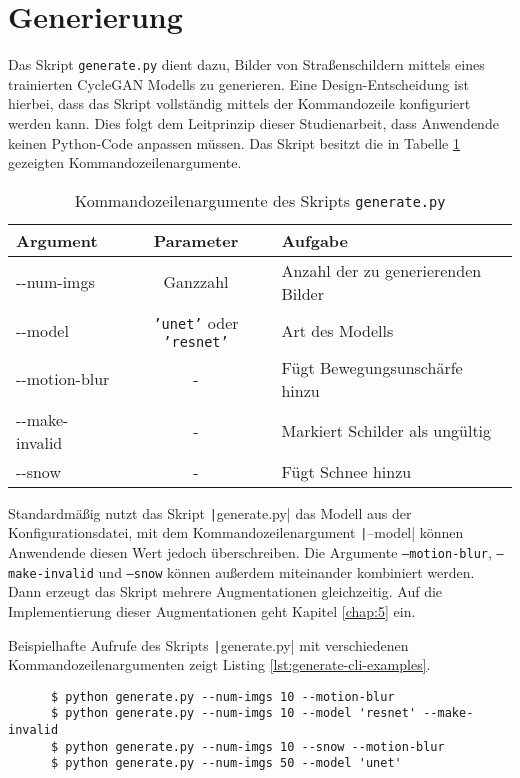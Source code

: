 \section{Generierung}
Das Skript \texttt{generate.py} dient dazu, Bilder von Straßenschildern mittels eines trainierten \ac{CycleGAN} Modells zu generieren. Eine Design-Entscheidung ist hierbei, dass das Skript vollständig mittels der Kommandozeile konfiguriert werden kann. Dies folgt dem Leitprinzip dieser Studienarbeit, dass Anwendende keinen Python-Code anpassen müssen. Das Skript besitzt die in Tabelle \ref{tab:generate-cli} gezeigten Kommandozeilenargumente.
\begin{table}[H]
   \centering
   \begin{tabular}{|l|c|l|}
   \hline
   \textbf{Argument} & \textbf{Parameter} & \textbf{Aufgabe} \\ \hline \hline
   -{}-num-imgs & Ganzzahl & Anzahl der zu generierenden Bilder \\ \hline
   -{}-model & \texttt{'unet'} oder \texttt{'resnet'} & Art des Modells \\ \hline
   -{}-motion-blur & - & Fügt Bewegungsunschärfe hinzu \\ \hline
   -{}-make-invalid & - & Markiert Schilder als ungültig \\ \hline
   -{}-snow & - & Fügt Schnee hinzu \\
   \hline
   \end{tabular}
   \caption{Kommandozeilenargumente des Skripts \lstinline[language=python]{generate.py}}
   \label{tab:generate-cli}
\end{table}

Standardmäßig nutzt das Skript \texttt|generate.py| das Modell aus der Konfigurationsdatei, mit dem Kommandozeilenargument \texttt|--model| können Anwendende diesen Wert jedoch überschreiben. Die Argumente \texttt{--motion-blur}, \texttt{--make-invalid} und \texttt{--snow} können außerdem miteinander kombiniert werden. Dann erzeugt das Skript mehrere Augmentationen gleichzeitig. Auf die Implementierung dieser Augmentationen geht Kapitel \ref{chap:5} ein.

Beispielhafte Aufrufe des Skripts \texttt|generate.py| mit verschiedenen Kommandozeilenargumenten zeigt Listing \ref{lst:generate-cli-examples}.
\begin{samepage}
\begin{code}
   \begin{verbatim}
      $ python generate.py --num-imgs 10 --motion-blur
      $ python generate.py --num-imgs 10 --model 'resnet' --make-invalid
      $ python generate.py --num-imgs 10 --snow --motion-blur
      $ python generate.py --num-imgs 50 --model 'unet'
   \end{verbatim}
   \caption{Beispielaufrufe des Skripts \lstinline[language=python]{generate.py}}
   \label{lst:generate-cli-examples}
\end{code}
\end{samepage}

